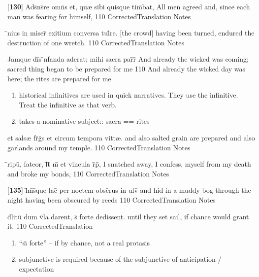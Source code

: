 \latline
  {[\textbf{130}] Ads\={}ns\={}re omn\={}s et, qu{\ae} sibi quisque tim\={}bat,}
  { All men agreed and, since each man was fearing for himself, }
  {110}
  { CorrectedTranslation }
  { Notes }


\latline
  {\={}nius in miser\={\macron {\i}} exitium conversa tul\={}re.}
  { [the crowd] having been turned, endured the destruction of one wretch. }
  {110}
  { CorrectedTranslation }
  { Notes }


\latline
  {Jamque di\={}s \={\macron {\i}}nfanda aderat; mihi sacra par\={}r\={\macron {\i}} }
  { And already the wicked was coming; sacred thing began to be prepared for me }
  {110}
  { And already the wicked day was here; the rites are prepared for me }
  { \begin{enumerate}
  	\item historical infinitives are used in quick narratives.  They use the infinitive.  Treat the infinitive as that verb.
  	\item takes a nominative subject:: sacra == rites
  \end{enumerate} }


\latline
  {et sals{\ae} fr\={}g\={}s et circum tempora vitt{\ae}.}
  { and also salted grain are prepared and also garlands around my temple. }
  {110}
  { CorrectedTranslation }
  { Notes }


\latline
  {\={}ripu\={\macron {\i}}, fateor, l\={}t\={} m\={} et vincula r\={}p\={\macron {\i}},}
  { I snatched away, I confess, myself from my death and broke my bonds, }
  {110}
  { CorrectedTranslation }
  { Notes }


\latline
  {[\textbf{135}] l\={\macron {\i}}m\={}s\={}que lac\={} per noctem obsc\={}rus in ulv\={}}
  { and hid in a muddy bog through the night having been obscured by reeds }
  {110}
  { CorrectedTranslation }
  { Notes }


\latline
  {d\={}litu\={\macron {\i}} dum v\={}la darent, s\={\macron {\i}} forte dedissent.}
  { until they set sail, if chance would grant it. }
  {110}
  { CorrectedTranslation }
  { \begin{enumerate}
  	\item ``s\={\i} forte'' -- if by chance, not a real protasis
  	\item subjunctive is required because of the subjunctive of anticipation / expectation
  \end{enumerate} }


